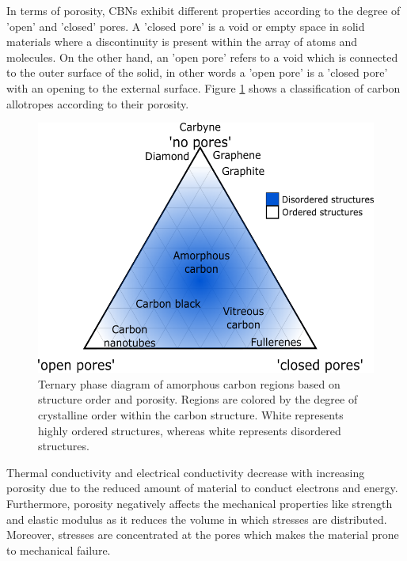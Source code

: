 In terms of porosity, CBNs exhibit different properties according to the degree of 'open' and 'closed' pores. A 'closed pore' is a void or empty space in solid materials where a discontinuity is present within the array of atoms and molecules. On the other hand, an 'open pore' refers to a void which is connected to the outer surface of the solid, in other words a 'open pore' is a 'closed pore' with an opening to the external surface. \cite{Marsh1989} Figure \ref{fig:carbonAllotropesPorosityNOrder} shows a classification of carbon allotropes according to their porosity.

\begin{figure}[!th]
\centering
\includegraphics[scale=0.65]{./Figures/carbonAllotropesPorosityNOrder.png}
\decoRule
\caption[Ternary Diagram of Carbon Allotropes based on Porosity and Structural Order]{Ternary phase diagram of amorphous carbon regions based on structure order and porosity. Regions are colored by the degree of crystalline order within the carbon structure. White represents highly ordered structures, whereas white represents disordered structures. \cite{Marsh1989, Hugh1994}}
\label{fig:carbonAllotropesPorosityNOrder}
\end{figure}

Thermal conductivity and electrical conductivity decrease with increasing porosity due to the reduced amount of material to conduct electrons and energy. Furthermore, porosity negatively affects the mechanical properties like strength and elastic modulus as it reduces the volume in which stresses are distributed. \cite{Hugh1994} Moreover, stresses are concentrated at the pores which makes the material prone to mechanical failure. \cite{Marsh1989, Hugh1994}

